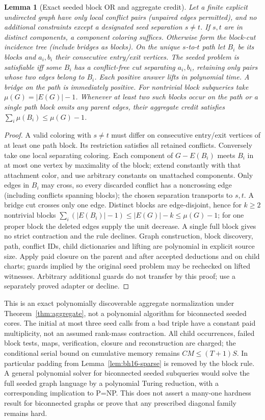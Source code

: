 \documentclass[11pt]{article}
\newtheorem{lemma}[theorem]{Lemma}
\begin{document}
\begin{lemma}[Exact seeded block OR and aggregate credit]\label{lem:bh16-block}
Let a finite explicit undirected graph have only local conflict pairs (unpaired edges permitted), and no additional constraints except a designated seed separation $s\ne t$. If $s,t$ are in distinct components, a component coloring suffices. Otherwise form the block-cut incidence tree (include bridges as blocks). On the unique $s$-to-$t$ path let $B_i$ be its blocks and $a_i,b_i$ their consecutive entry/exit vertices. The seeded problem is satisfiable iff some $B_i$ has a conflict-free cut separating $a_i,b_i$, retaining only pairs whose two edges belong to $B_i$. Each positive answer lifts in polynomial time. A bridge on the path is immediately positive. For nontrivial block subqueries take $\mu(G)=|E(G)|-1$. Whenever at least two such blocks occur on the path or a single path block omits any parent edges, their aggregate credit satisfies $\sum_i\mu(B_i)\le\mu(G)-1$.
\end{lemma}
\begin{proof}
A valid coloring with $s\ne t$ must differ on consecutive entry/exit vertices of at least one path block. Its restriction satisfies all retained conflicts. Conversely take one local separating coloring. Each component of $G-E(B_i)$ meets $B_i$ in at most one vertex by maximality of the block; extend constantly with that attachment color, and use arbitrary constants on unattached components. Only edges in $B_i$ may cross, so every discarded conflict has a noncrossing edge (including conflicts spanning blocks); the chosen separation transports to $s,t$. A bridge cut crosses only one edge. Distinct blocks are edge-disjoint, hence for $k\ge2$ nontrivial blocks $\sum_i(|E(B_i)|-1)\le |E(G)|-k\le\mu(G)-1$; for one proper block the deleted edges supply the unit decrease. A single full block gives no strict contraction and the rule declines. Graph construction, block discovery, path, conflict IDs, child dictionaries and lifting are polynomial in explicit source size. Apply paid closure on the parent and after accepted deductions and on child charts; guards implied by the original seed problem may be rechecked on lifted witnesses. Arbitrary additional guards do not transfer by this proof; use a separately proved adapter or decline.
\end{proof}
This is an exact polynomially discoverable aggregate normalization under Theorem~\ref{thm:aggregate}, not a polynomial algorithm for biconnected seeded cores. The initial at most three seed calls from a bad triple have a constant paid multiplicity, not an assumed rank-mass contraction. All child occurrences, failed block tests, maps, verification, closure and reconstruction are charged; the conditional serial bound on cumulative memory remains $CM\le(T+1)S$. In particular padding from Lemma~\ref{lem:bh16-sparse} is removed by the block rule. A general polynomial solver for biconnected seeded subqueries would solve the full seeded graph language by a polynomial Turing reduction, with a corresponding implication to P=NP. This does not assert a many-one hardness result for biconnected graphs or prove that any prescribed diagonal family remains hard.
\end{document}
